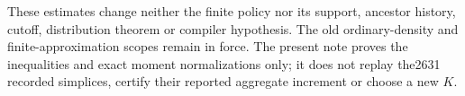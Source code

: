 These estimates change neither the finite policy nor its support,
ancestor history, cutoff, distribution theorem or compiler hypothesis.
The old ordinary-density and finite-approximation scopes remain in
force. The present note proves the inequalities and exact moment
normalizations only; it does not replay the2631 recorded simplices,
certify their reported aggregate increment or choose a new $K$.
